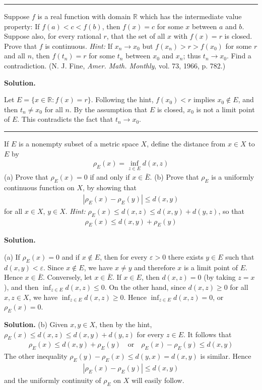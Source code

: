 \documentclass[12pt]{article}
\theoremstyle{definition}
\begin{document}
\bigskip\noindent\hrule\bigskip

Suppose $f$ is a real function with domain $\mathbb{R}$ which has the intermediate value property: If $f(a)<c<f(b)$, then $f(x)=c$ for some $x$ between $a$ and $b$.
Suppose also, for every rational $r$, that the set of all $x$ with $f(x)=r$ is closed. Prove that $f$ is continuous.
\textit{Hint:} If $x_n\to x_0$ but $f(x_n)>r>f(x_0)$ for some $r$ and all $n$, then $f(t_n)=r$ for some $t_n$ between $x_0$ and $x_n$; thus $t_n\to x_0$. Find a contradiction. (N. J. Fine, \textit{Amer. Math. Monthly}, vol. 73, 1966, p. 782.)

\smallskip
\noindent\textbf{Solution.}\quad

Let $E=\{x\in \mathbb{R}:f(x)=r\}$. Following the hint, $f(x_0)<r$ implies $x_0\notin E$, and then $t_n\ne x_0$ for all $n$. By the assumption that $E$ is closed, $x_0$ is not a limit point of $E$. This contradicts the fact that $t_n\to x_0$.



\bigskip\noindent\hrule\bigskip

If $E$ is a nonempty subset of a metric space $X$, define the distance from $x\in X$ to $E$ by
\begin{align*}
\rho_E(x)=\inf_{z\in E}d(x,z)
\end{align*}
(a) Prove that $\rho_E(x)=0$ if and only if $x\in\bar{E}$.
(b) Prove that $\rho_E$ is a uniformly continuous function on $X$, by showing that
\begin{align*}
\left\vert\rho_E(x)-\rho_E(y)\right\vert\le d(x,y)
\end{align*}
for all $x\in X$, $y\in X$.
\textit{Hint:} $\rho_E(x)\le d(x,z)\le d(x,y)+d(y,z)$, so that
\begin{align*}
\rho_E(x)\le d(x,y)+\rho_E(y)
\end{align*}

\smallskip
\noindent\textbf{Solution.}\quad

(a) If $\rho_E(x)=0$ and if $x\notin E$, then for every $\varepsilon>0$ there exists $y\in E$ such that $d(x,y)<\varepsilon$. Since $x\notin E$, we have $x\ne y$ and therefore $x$ is a limit point of $E$. Hence $x\in\bar{E}$. Conversely, let $x\in\bar{E}$. If $x\in E$, then $d(x,z)=0$ (by taking $z=x$), and then $\inf_{z\in E}d(x,z)\le 0$. On the other hand, since $d(x,z)\ge 0$ for all $x,z\in X$, we have $\inf_{z\in E}d(x,z)\ge 0$. Hence $\inf_{z\in E}d(x,z)=0$, or $\rho_E(x)=0$.

\smallskip
\noindent\textbf{Solution.}\quad
(b) Given $x,y\in X$, then by the hint, $\rho_E(x)\le d(x,z)\le d(x,y)+d(y,z)$ for every $z\in E$. It follows that
\begin{align*}
\rho_E(x)\le d(x,y)+\rho_E(y)\quad\mbox{or}\quad \rho_E(x)-\rho_E(y)\le d(x,y)
\end{align*}
The other inequality $\rho_E(y)-\rho_E(x)\le d(y,x)=d(x,y)$ is similar. Hence
\begin{align*}
\left\vert\rho_E(x)-\rho_E(y)\right\vert\le d(x,y)
\end{align*}
and the uniformly continuity of $\rho_E$ on $X$ will easily follow.
\end{document}
